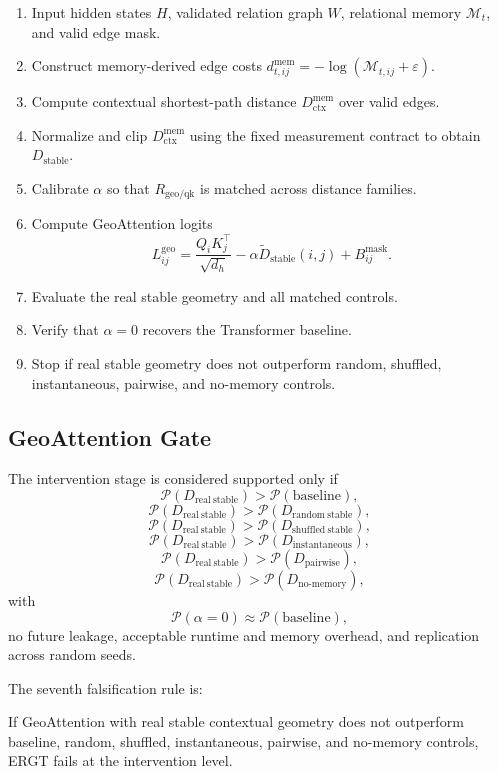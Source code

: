 \documentclass[11pt]{article}
\begin{document}
\begin{enumerate}[label=\arabic*.]
    \item Input hidden states $H$, validated relation graph $W$, relational memory $\mathcal{M}_t$, and valid edge mask.
    \item Construct memory-derived edge costs $d_{t,ij}^{\mathrm{mem}}=-\log(\mathcal{M}_{t,ij}+\varepsilon)$.
    \item Compute contextual shortest-path distance $D_{\mathrm{ctx}}^{\mathrm{mem}}$ over valid edges.
    \item Normalize and clip $D_{\mathrm{ctx}}^{\mathrm{mem}}$ using the fixed measurement contract to obtain $D_{\mathrm{stable}}$.
    \item Calibrate $\alpha$ so that $R_{\mathrm{geo/qk}}$ is matched across distance families.
    \item Compute GeoAttention logits
    \[
    L_{ij}^{\mathrm{geo}}=
    \frac{Q_iK_j^\top}{\sqrt{d_h}}
    -\alpha\widetilde{D}_{\mathrm{stable}}(i,j)
    +B_{ij}^{\mathrm{mask}}.
    \]
    \item Evaluate the real stable geometry and all matched controls.
    \item Verify that $\alpha=0$ recovers the Transformer baseline.
    \item Stop if real stable geometry does not outperform random, shuffled, instantaneous, pairwise, and no-memory controls.
\end{enumerate}

\subsection{GeoAttention Gate}

The intervention stage is considered supported only if
\[
\mathcal{P}(D_{\mathrm{real\ stable}})>
\mathcal{P}(\mathrm{baseline}),
\]
\[
\mathcal{P}(D_{\mathrm{real\ stable}})>
\mathcal{P}(D_{\mathrm{random\ stable}}),
\]
\[
\mathcal{P}(D_{\mathrm{real\ stable}})>
\mathcal{P}(D_{\mathrm{shuffled\ stable}}),
\]
\[
\mathcal{P}(D_{\mathrm{real\ stable}})>
\mathcal{P}(D_{\mathrm{instantaneous}}),
\]
\[
\mathcal{P}(D_{\mathrm{real\ stable}})>
\mathcal{P}(D_{\mathrm{pairwise}}),
\]
\[
\mathcal{P}(D_{\mathrm{real\ stable}})>
\mathcal{P}(D_{\mathrm{no\text{-}memory}}),
\]
with
\[
\mathcal{P}(\alpha=0)\approx\mathcal{P}(\mathrm{baseline}),
\]
no future leakage, acceptable runtime and memory overhead, and replication across random seeds.

The seventh falsification rule is:
\begin{ergtclaim}
If GeoAttention with real stable contextual geometry does not outperform baseline, random, shuffled, instantaneous, pairwise, and no-memory controls, ERGT fails at the intervention level.
\end{ergtclaim}
\end{document}
